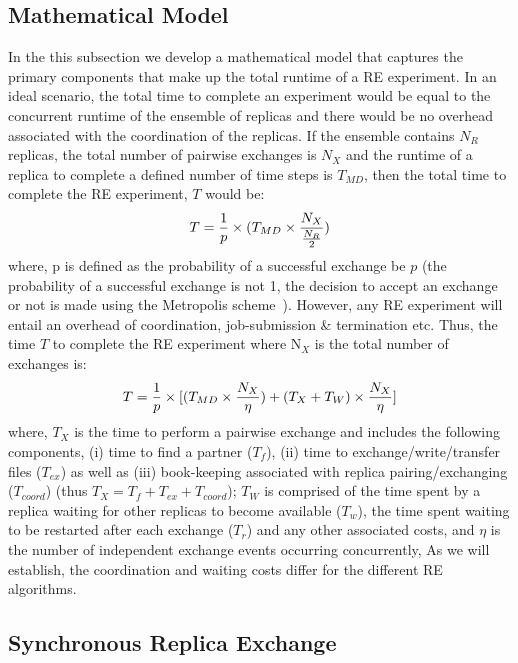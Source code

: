 \documentclass{rspublic}
\newcommand{\alnote}[1]{ {\textcolor{blue} { ***andre: #1 }}}
\newcommand{\alnote}[1]{}
\begin{document}
\subsection{Mathematical Model}

In the this subsection we develop a mathematical model that captures
the primary components that make up the total runtime of a RE
experiment. In an ideal scenario, the total time to complete an
experiment would be equal to the concurrent runtime of the ensemble of
replicas and there would be no overhead associated with the
coordination of the replicas.  If the ensemble contains $N_R$
replicas, the total number of pairwise exchanges is $N_X$ and the
runtime of a replica to complete a defined number of time steps is
$T_{MD}$, then the total time to complete the RE experiment, $T$ would
be:
\begin{eqnarray}
T = {1\over p} \times (T_{MD} \times  {N_X \over {N_R \over 2}}) 
\label{eq:totaltime}
\end{eqnarray}
where, p is defined as the probability of a successful exchange be $p$
(the probability of a successful exchange is not 1, the
decision to accept an exchange or not is made using the
Metropolis scheme~\citep{metropolis:1087}). However, any RE experiment will entail an overhead
of coordination, job-submission \& termination etc. Thus, the time $T$
to complete the RE experiment where N$_X$ is the total number of
exchanges is:
\begin{eqnarray}
  T = {1\over p} \times [(T_{MD} \times  {N_X \over {\eta}}) +
  {(T_{X} + T_{W})} \times {N_X \over \eta}]
\label{eq:totaltime}
\end{eqnarray}
where, $T_{X}$ is the time to perform a pairwise exchange and includes
the following components, (i) time to find a partner ($T_f$), (ii)
time to exchange/write/transfer files ($T_{ex}$) as well as (iii)
book-keeping associated with replica pairing/exchanging ($T_{coord}$)
(thus $T_{X} = T_{f} + T_{ex}+T_{coord}$); 
$T_W$ is comprised of the time spent by a replica waiting for other
replicas to become available ($T_w$), the time spent waiting to be restarted
after each exchange ($T_r$) and any other associated costs, and $\eta$
is the number of independent exchange events occurring concurrently,
As we will establish, the coordination and waiting costs differ for
the different RE algorithms.

\subsection{Synchronous Replica Exchange}
\end{document}

